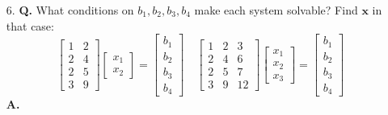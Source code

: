 \documentclass[main.tex]{subfiles}
\begin{document}
\begin{enumerate}
    \item [6.] \textbf{Q.} What conditions on $b_{1}, b_{2}, b_{3}, b_{4}$ make each system solvable? Find $\boldsymbol{x}$ in that case:
    $$
    \left[\begin{array}{ll}
    1 & 2 \\
    2 & 4 \\
    2 & 5 \\
    3 & 9
    \end{array}\right]\left[\begin{array}{l}
    x_{1} \\
    x_{2}
    \end{array}\right]=\left[\begin{array}{l}
    b_{1} \\
    b_{2} \\
    b_{3} \\
    b_{4}
    \end{array}\right] \quad\left[\begin{array}{rrr}
    1 & 2 & 3 \\
    2 & 4 & 6 \\
    2 & 5 & 7 \\
    3 & 9 & 12
    \end{array}\right]\left[\begin{array}{l}
    x_{1} \\
    x_{2} \\
    x_{3}
    \end{array}\right]=\left[\begin{array}{l}
    b_{1} \\
    b_{2} \\
    b_{3} \\
    b_{4}
    \end{array}\right]
    $$
    \textbf{A.}
    

\end{enumerate}
\end{document}
